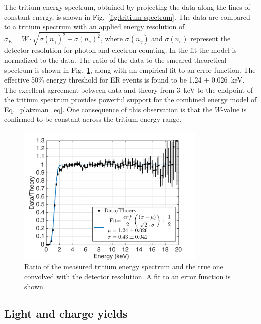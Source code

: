 The tritium energy spectrum, obtained by projecting the data along the lines of constant energy, is shown in Fig.~\ref{fig:tritium-spectrum}. The data are compared to a tritium spectrum with an applied energy resolution of $ \sigma_E = W \cdot \sqrt{\sigma(n_{\gamma})^2 + \sigma(n_e)^2}$, where $ \sigma(n_{\gamma})$ and $ \sigma(n_e)$ represent the detector resolution for photon and electron counting. In the fit the model is normalized to the data. The ratio of the data to the smeared theoretical spectrum is shown in Fig.~\ref{fig:ER-threshold}, along with an empirical fit to an error function. The effective 50\% energy threshold for ER events is found to be 1.24 $\pm$ 0.026~keV. The excellent agreement between data and theory from 3~keV to the endpoint of the tritium spectrum provides powerful support for the combined energy model of Eq.~\ref{platzman_eq}. One consequence 
of this observation is that the $W$-value is confirmed to be constant across the tritium energy range. 


\begin{figure}[t!]
\includegraphics[width=90mm]{fig6.pdf}
\caption{Ratio of the measured tritium energy spectrum and the true one convolved with the detector resolution. A fit to an error function is shown.}
\label{fig:ER-threshold}
\end{figure}

\subsection{Light and charge yields}

